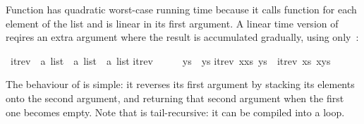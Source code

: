 \begin{isabellebody}
\begin{isamarkuptext}
Function  has quadratic worst-case running time
because it calls function \isa{{\isacharat}} for each element of the list and
\isa{{\isacharat}} is linear in its first argument.  A linear time version of
 reqires an extra argument where the result is accumulated
gradually, using only~\isa{{\isacharhash}}:%
\end{isamarkuptext}%
\isamarkuptrue%
\isamarkupfalse%
\ itrev\ {\isacharcolon}{\isacharcolon}\ {\isachardoublequoteopen}{\isacharprime}a\ list\ {\isasymRightarrow}\ {\isacharprime}a\ list\ {\isasymRightarrow}\ {\isacharprime}a\ list{\isachardoublequoteclose}\isanewline
{}\isamarkupfalse%
\isanewline
{\isachardoublequoteopen}itrev\ {\isacharbrackleft}{\isacharbrackright}\ \ \ \ \ ys\ {\isacharequal}\ ys{\isachardoublequoteclose}\isanewline
{\isachardoublequoteopen}itrev\ {\isacharparenleft}x{\isacharhash}xs{\isacharparenright}\ ys\ {\isacharequal}\ itrev\ xs\ {\isacharparenleft}x{\isacharhash}ys{\isacharparenright}{\isachardoublequoteclose}%
\begin{isamarkuptext}%
\noindent
The behaviour of  is simple: it reverses
its first argument by stacking its elements onto the second argument,
and returning that second argument when the first one becomes
empty. Note that  is tail-recursive: it can be
compiled into a loop.


\end{isamarkuptext}
\end{isabellebody}
